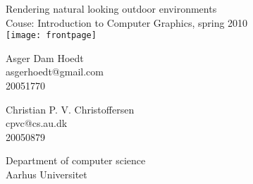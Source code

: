 \documentclass[a4paper,english]{report}
\begin{document}
\begin{titlepage}

\thispagestyle{empty}
\centering
{ \baselineskip=24pt
    \vspace*{80pt}
    {\LARGE Rendering natural looking outdoor environments}\\
    Couse: Introduction to Computer Graphics, spring 2010
    \vspace*{20pt}
    \\
    \texttt{[image: frontpage]}
    \vspace*{40pt}
    \\
    \begin{minipage}{0.4\textwidth}
      \centering
      Asger Dam Hoedt \\ asgerhoedt@gmail.com \\ 20051770
    \end{minipage}
    \begin{minipage}{0.4\textwidth}
      \centering
      Christian P. V. Christoffersen \\ cpvc@cs.au.dk \\ 20050879
    \end{minipage}
}
\vfill
\small
Department of computer science\\
Aarhus Universitet
\end{titlepage}

\clearpage{}
\tableofcontents

\clearpage{}

















\appendix




\end{document}
